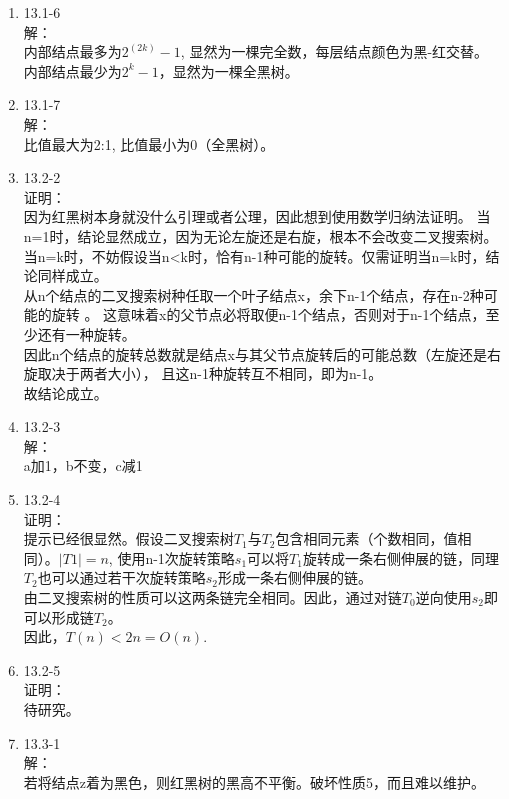 \documentclass[UTF8]{ctexart}
\begin{document}
\begin{enumerate}
	\item 13.1-6 \\
	解：\\
		内部结点最多为$2^(2k)-1$, 显然为一棵完全数，每层结点颜色为黑-红交替。\\
		内部结点最少为$2^k-1$，显然为一棵全黑树。
		
	\item 13.1-7 \\
	解：\\
		比值最大为2:1, 比值最小为0（全黑树）。
		
	\item 13.2-2 \\
	证明：\\
		因为红黑树本身就没什么引理或者公理，因此想到使用数学归纳法证明。
		当n=1时，结论显然成立，因为无论左旋还是右旋，根本不会改变二叉搜索树。
		当n=k时，不妨假设当n<k时，恰有n-1种可能的旋转。仅需证明当n=k时，结论同样成立。\\
		从n个结点的二叉搜索树种任取一个叶子结点x，余下n-1个结点，存在n-2种可能的旋转 。
		这意味着x的父节点必将取便n-1个结点，否则对于n-1个结点，至少还有一种旋转。\\
		因此n个结点的旋转总数就是结点x与其父节点旋转后的可能总数（左旋还是右旋取决于两者大小），
		且这n-1种旋转互不相同，即为n-1。\\
		故结论成立。
		
	\item 13.2-3 \\
	解：\\
		a加1，b不变，c减1
		
	\item 13.2-4 \\
	证明：\\
		提示已经很显然。假设二叉搜索树$T_1$与$T_2$包含相同元素（个数相同，值相同）。$|T1| = n$,
		使用n-1次旋转策略$s_1$可以将$T_1$旋转成一条右侧伸展的链，同理$T_2$也可以通过若干次旋转策略$s_2$形成一条右侧伸展的链。\\
		由二叉搜索树的性质可以这两条链完全相同。因此，通过对链$T_0$逆向使用$s_2$即可以形成链$T_2$。\\
		因此，$T(n) < 2n = O(n)$.
		
	\item 13.2-5 \\
	证明：\\
		待研究。
		
	\item 13.3-1 \\
	解：\\
		若将结点z着为黑色，则红黑树的黑高不平衡。破坏性质5，而且难以维护。
		

\end{enumerate}
\end{document}

